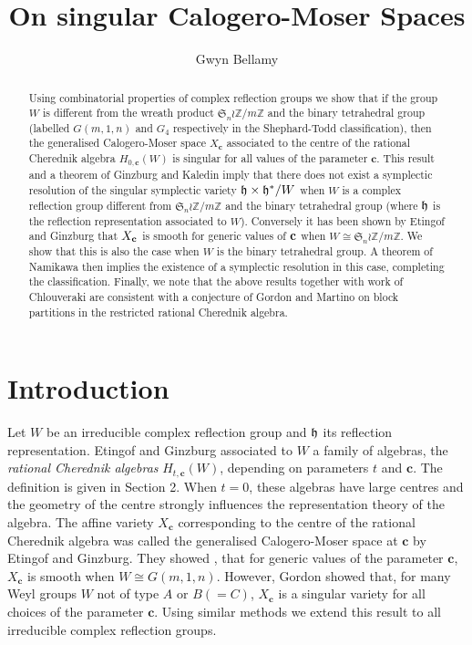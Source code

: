 \documentclass[a4apper,10pt]{amsart}
\theoremstyle{definition}
\numberwithin{thm}{section}
\begin{document}
\title{On singular Calogero-Moser Spaces}
\author{Gwyn Bellamy}
\address{School of Mathematics and Maxwell Institute for Mathematical Sciences, University of Edinburgh, James Clerk Maxwell Building, Kings Buildings, Mayfield Road, Edinburgh EH9 3JZ, Scotland}
\maketitle
\begin{abstract}
\noindent Using combinatorial properties of complex reflection groups we show that if the group $W$ is different from the wreath product $\mathfrak{S}_n\wr \mathbb{Z}/m\mathbb{Z}$ and the binary tetrahedral group (labelled $G(m,1,n)$ and $G_4$ respectively in the Shephard-Todd classification), then the generalised Calogero-Moser space $X_{\mathbf{c}}$ associated to the centre of the rational Cherednik algebra $H_{0,\mathbf{c}}(W)$ is singular for all values of the parameter $\mathbf{c}$. This result and a theorem of Ginzburg and Kaledin imply that there does not exist a symplectic resolution of the singular symplectic variety $\frak{h} \times \frak{h}^* / W$ when $W$ is a complex reflection group different from $\mathfrak{S}_n\wr \mathbb{Z}/m\mathbb{Z}$ and the binary tetrahedral group (where $\frak{h}$ is the reflection representation associated to $W$). Conversely it has been shown by Etingof and Ginzburg that $X_{\bf{c}}$ is smooth for generic values of $\bf{c}$ when $W \cong \mathfrak{S}_n \wr \mathbb{Z}/m\mathbb{Z}$. We show that this is also the case when $W$ is the binary tetrahedral group. A theorem of Namikawa then implies the existence of a symplectic resolution in this case, completing the classification. Finally, we note that the above results together with work of Chlouveraki are consistent with a conjecture of Gordon and Martino on block partitions in the restricted rational Cherednik algebra.
\end{abstract}


\section{Introduction}
Let $W$ be an irreducible complex reflection group and $\frak{h}$ its reflection representation. Etingof and Ginzburg \cite{1} associated to $W$ a family of algebras, the \textit{rational Cherednik algebras} $H_{t,\mathbf{c}}(W)$, depending on parameters $t$ and $\mathbf{c}$. The definition is given in Section 2. When $t = 0$, these algebras have large centres and the geometry of the centre strongly influences the representation theory of the algebra. The affine variety $X_{\mathbf{c}}$ corresponding to the centre of the rational Cherednik algebra was called the generalised Calogero-Moser space at $\mathbf{c}$ by Etingof and Ginzburg. They showed \cite[Corollary 1.14]{1}, that for generic values of the parameter $\mathbf{c}$, $X_{\mathbf{c}}$ is smooth when $W \cong G(m,1,n)$. However, Gordon \cite[Proposition 7.3]{6} showed that, for many Weyl groups $W$ not of type $A$ or $B(=C)$, $X_{\mathbf{c}}$ is a singular variety for all choices of the parameter $\mathbf{c}$. Using similar methods we extend this result to all irreducible complex reflection groups. 
\end{document}
